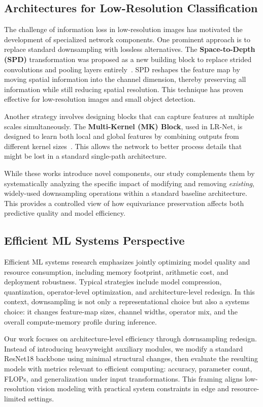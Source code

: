 \documentclass[conference]{IEEEtran}
\begin{document}
\subsection{Architectures for Low-Resolution Classification}\label{subsec:arch_for_low_res}
The challenge of information loss in low-resolution images has motivated the development of specialized network components. One prominent approach is to replace standard downsampling with lossless alternatives. The \textbf{Space-to-Depth (SPD)} transformation was proposed as a new building block to replace strided convolutions and pooling layers entirely~\cite{sunkara2022}. SPD reshapes the feature map by moving spatial information into the channel dimension, thereby preserving all information while still reducing spatial resolution. This technique has proven effective for low-resolution images and small object detection.

Another strategy involves designing blocks that can capture features at multiple scales simultaneously. The \textbf{Multi-Kernel (MK) Block}, used in LR-Net, is designed to learn both local and global features by combining outputs from different kernel sizes~\cite{ganj2023}. This allows the network to better process details that might be lost in a standard single-path architecture.

While these works introduce novel components, our study complements them by systematically analyzing the specific impact of modifying and removing \textit{existing}, widely-used downsampling operations within a standard baseline architecture. This provides a controlled view of how equivariance preservation affects both predictive quality and model efficiency.

\subsection{Efficient ML Systems Perspective}\label{subsec:efficient_systems}
Efficient ML systems research emphasizes jointly optimizing model quality and resource consumption, including memory footprint, arithmetic cost, and deployment robustness. Typical strategies include model compression, quantization, operator-level optimization, and architecture-level redesign. In this context, downsampling is not only a representational choice but also a systems choice: it changes feature-map sizes, channel widths, operator mix, and the overall compute-memory profile during inference.

Our work focuses on architecture-level efficiency through downsampling redesign. Instead of introducing heavyweight auxiliary modules, we modify a standard ResNet18 backbone using minimal structural changes, then evaluate the resulting models with metrics relevant to efficient computing: accuracy, parameter count, FLOPs, and generalization under input transformations. This framing aligns low-resolution vision modeling with practical system constraints in edge and resource-limited settings.
\end{document}
